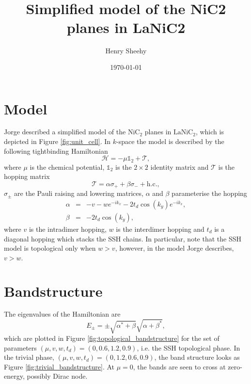 \title{Simplified model of the NiC2 planes in LaNiC2}
\author{Henry Sheehy}
\date{ \today }
  
\maketitle
  
\tableofcontents
\newpage

\section{Model}
Jorge described a simplified model of the $\text{NiC}_2$ planes in $\text{LaNiC}_2$, which is depicted in Figure \ref{fig:unit_cell}.
In $k$-space the model is described by the following tightbinding Hamiltonian
\begin{equation}
    \mathcal{H}= -\mu\mathbb{1}_2+\mathcal{T},
\end{equation}
where $\mu$ is the chemical potential, $\mathbb{1}_2$ is the $2\times2$ identity matrix and $\mathcal{T}$ is the hopping matrix
\begin{equation}
    \mathcal{T}= \alpha \sigma_+ +\beta \sigma_- +\text{h.c.},
\end{equation}
$\sigma_\pm$ are the Pauli raising and lowering matrices, $\alpha$ and $\beta$ parameterise the hopping
\begin{eqnarray}
    \alpha &=& -v-w e^{-ik_x}-2t_d\cos{(k_y)}e^{-i k_x},\\
    \beta &=& -2t_d\cos{(k_y)},
\end{eqnarray}
where $v$ is the intradimer hopping, $w$ is the interdimer hopping and $t_d$ is a diagonal hopping which stacks the SSH chains.
In particular, note that the SSH model is topological only when $w>v$, however, in the model Jorge describes, $v>w$.


\newpage
\section{Bandstructure}
The eigenvalues of the Hamiltonian are
\begin{equation}
    E_\pm = \pm\sqrt{\alpha^*+\beta} \sqrt{\alpha+\beta^*},
\end{equation}
which are plotted in Figure \ref{fig:topological_bandstructure} for the set of parameters
$(\mu, v, w, t_d) = (0, 0.6, 1.2, 0.9)$,
i.e.
the SSH topological phase.
In the trivial phase, 
$(\mu, v, w, t_d) = (0, 1.2, 0.6, 0.9)$,
the band structure looks as Figure \ref{fig:trivial_bandstructure}.
At $\mu=0$, the bands are seen to cross at zero-energy, possibly  Dirac node.

